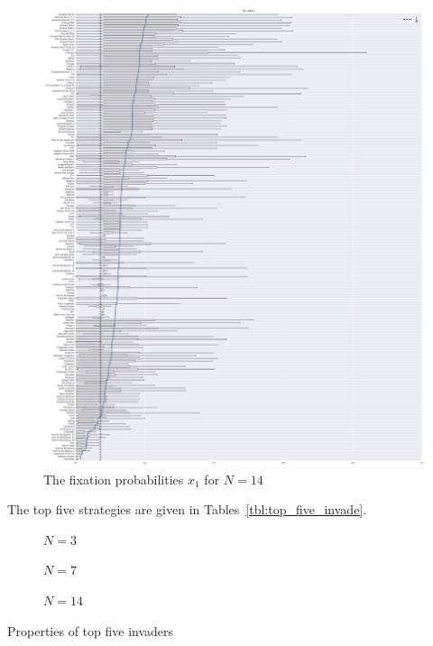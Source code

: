 \documentclass{article}
\begin{document}
\begin{figure}[!hbtp]
    \centering
    \includegraphics[height=.9\textheight]{./img/boxplot_14_invade.pdf}
    \caption{The fixation probabilities \(x_1\) for \(N=14\)}
    \label{fig:boxplot_14_invade}
\end{figure}

The top five strategies are given in Tables~\ref{tbl:top_five_invade}.

\begin{table}[!hbtp]
    \begin{subfigure}[t]{\textwidth}
        \centering
        
        \caption{\(N=3\)}
    \end{subfigure}
    \begin{subfigure}[t]{\textwidth}
        \centering
        
        \caption{\(N=7\)}
    \end{subfigure}
    \begin{subfigure}[t]{\textwidth}
        \centering
        
        \caption{\(N=14\)}
    \end{subfigure}
    \caption{Properties of top five invaders}
    \label{tbl:top_five_invade}
\end{table}
\end{document}
